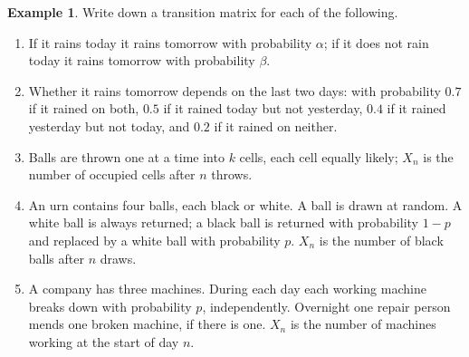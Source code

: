 \documentclass[12pt,a4paper]{report}
\theoremstyle{definition}
\newtheorem{exa}[thm]{Example}
\begin{document}
\begin{exa}
\label{ex:mcmodels}
Write down a transition matrix for each of the following.
\begin{enumerate}
\item[(a)] If it rains today it rains tomorrow with probability $\alpha$; if it does not rain
today it rains tomorrow with probability $\beta$.
\item[(b)] Whether it rains tomorrow depends on the last two days: with probability $0.7$ if it
rained on both, $0.5$ if it rained today but not yesterday, $0.4$ if it rained yesterday but
not today, and $0.2$ if it rained on neither.
\item[(c)] Balls are thrown one at a time into $k$ cells, each cell equally likely; $X_n$ is the
number of occupied cells after $n$ throws.
\item[(d)] An urn contains four balls, each black or white. A ball is drawn at random. A white
ball is always returned; a black ball is returned with probability $1 - p$ and replaced by a
white ball with probability $p$. $X_n$ is the number of black balls after $n$ draws.
\item[(e)] A company has three machines. During each day each working machine breaks down
with probability $p$, independently. Overnight one repair person mends one broken machine,
if there is one. $X_n$ is the number of machines working at the start of day $n$.
\end{enumerate}
\end{exa}
\end{document}
